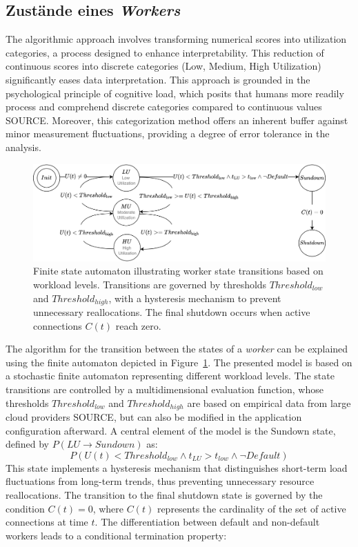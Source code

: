 \documentclass[twocolumn]{webofc}
\begin{document}
\subsection{Zustände eines \textit{Workers}}
The algorithmic approach involves transforming numerical scores into utilization categories, a process designed to enhance interpretability. This reduction of continuous scores into discrete categories (Low, Medium, High Utilization) significantly eases data interpretation. This approach is grounded in the psychological principle of cognitive load, which posits that humans more readily process and comprehend discrete categories compared to continuous values {\color{red} SOURCE}. Moreover, this categorization method offers an inherent buffer against minor measurement fluctuations, providing a degree of error tolerance in the analysis.
\begin{figure}[htbp]
\centering
\includegraphics[width=\textwidth]{utilizations.drawio.png}
\caption{Finite state automaton illustrating worker state transitions based on workload levels. Transitions are governed by thresholds $Threshold_{low}$ and $Threshold_{high}$, with a hysteresis mechanism to prevent unnecessary reallocations. The final shutdown occurs when active connections $C(t)$ reach zero.}
\label{fig:automat}
\end{figure} The algorithm for the transition between the states of a \textit{worker} can be explained using the finite automaton depicted in Figure~\ref{fig:automat}. The presented model is based on a stochastic finite automaton representing different workload levels. The state transitions are controlled by a multidimensional evaluation function, whose thresholds $Threshold_{low}$ and $Threshold_{high}$ are based on empirical data from large cloud providers {\color{red} SOURCE}, but can also be modified in the application configuration afterward. A central element of the model is the Sundown state, defined by \( P(LU \rightarrow Sundown) \) as:
$$P(U(t) < Threshold_{low} \wedge t_{LU} > t_{low} \wedge \neg Default) $$
This state implements a hysteresis mechanism that distinguishes short-term load fluctuations from long-term trends, thus preventing unnecessary resource reallocations. The transition to the final shutdown state is governed by the condition $C(t) = 0$, where $C(t)$ represents the cardinality of the set of active connections at time $t$. The differentiation between default and non-default workers leads to a conditional termination property:
\end{document}
